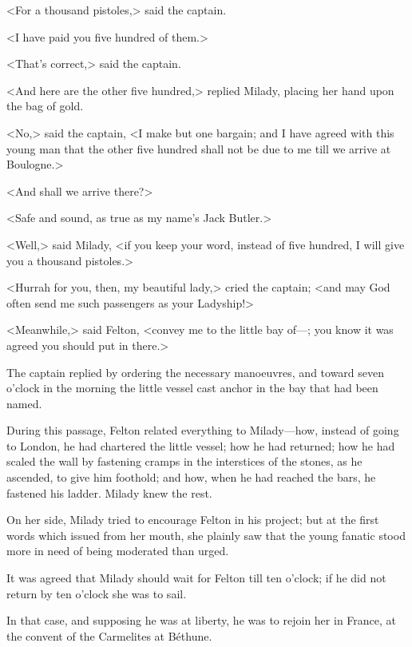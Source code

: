 <For a thousand pistoles,> said the captain. 

<I have paid you five hundred of them.> 

<That's correct,> said the captain. 

<And here are the other five hundred,> replied Milady, placing her hand upon the bag of gold. 

<No,> said the captain, <I make but one bargain; and I have agreed with this young man that the other five hundred shall not be due to me till we arrive at Boulogne.> 

<And shall we arrive there?> 

<Safe and sound, as true as my name's Jack Butler.> 

<Well,> said Milady, <if you keep your word, instead of five hundred, I will give you a thousand pistoles.> 

<Hurrah for you, then, my beautiful lady,> cried the captain; <and may God often send me such passengers as your Ladyship!> 

<Meanwhile,> said Felton, <convey me to the little bay of---; you know it was agreed you should put in there.> 

The captain replied by ordering the necessary manoeuvres, and toward seven o'clock in the morning the little vessel cast anchor in the bay that had been named. 

During this passage, Felton related everything to Milady---how, instead of going to London, he had chartered the little vessel; how he had returned; how he had scaled the wall by fastening cramps in the interstices of the stones, as he ascended, to give him foothold; and how, when he had reached the bars, he fastened his ladder. Milady knew the rest. 

On her side, Milady tried to encourage Felton in his project; but at the first words which issued from her mouth, she plainly saw that the young fanatic stood more in need of being moderated than urged. 

It was agreed that Milady should wait for Felton till ten o'clock; if he did not return by ten o'clock she was to sail. 

In that case, and supposing he was at liberty, he was to rejoin her in France, at the convent of the Carmelites at Béthune.

